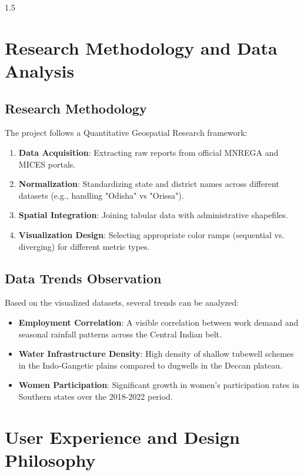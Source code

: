 \documentclass[12pt,a4paper]{report}
\begin{document}
\begin{spacing}{1.5}
\chapter{Research Methodology and Data Analysis}

\section{Research Methodology}
The project follows a Quantitative Geospatial Research framework:
\begin{enumerate}
    \item \textbf{Data Acquisition}: Extracting raw reports from official MNREGA and MICES portals.
    \item \textbf{Normalization}: Standardizing state and district names across different datasets (e.g., handling "Odisha" vs "Orissa").
    \item \textbf{Spatial Integration}: Joining tabular data with administrative shapefiles.
    \item \textbf{Visualization Design}: Selecting appropriate color ramps (sequential vs. diverging) for different metric types.
\end{enumerate}

\section{Data Trends Observation}
Based on the visualized datasets, several trends can be analyzed:
\begin{itemize}
    \item \textbf{Employment Correlation}: A visible correlation between work demand and seasonal rainfall patterns across the Central Indian belt.
    \item \textbf{Water Infrastructure Density}: High density of shallow tubewell schemes in the Indo-Gangetic plains compared to dugwells in the Deccan plateau.
    \item \textbf{Women Participation}: Significant growth in women's participation rates in Southern states over the 2018-2022 period.
\end{itemize}

\chapter{User Experience and Design Philosophy}


\end{spacing}
\end{document}
